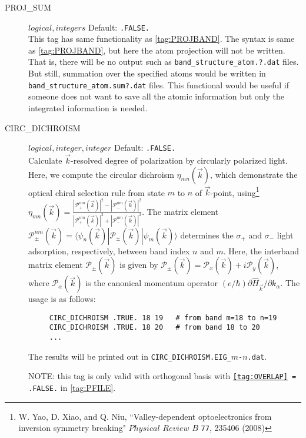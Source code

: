 \documentclass[a4paper,12pt]{scrartcl}
\makeatletter
\def\namedlabel#1#2{\begingroup
    #2%
    \def\@currentlabel{#2}%
    \phantomsection\label{#1}\endgroup
}
\makeatother
\begin{document}
\begin{description}
    \item[\namedlabel{tag:PROSUM}{PROJ\_SUM}] $logical, integers$ Default: \texttt{.FALSE.} \\
		This tag has same functionality as \ref{tag:PROJBAND}. The syntax is same as  \ref{tag:PROJBAND}, but here the atom projection will not be written. That is, there will be no output such as \texttt{band\_structure\_atom.?.dat} files. But still, summation over the specified atoms would be written  in \texttt{band\_structure\_atom.sum?.dat} files. This functional would be useful if someone does not want to save all the atomic information but only the integrated information is needed.
      
     \item[\namedlabel{tag:CIRC}{CIRC\_DICHROISM}] $logical, integer, integer$ Default: \texttt{.FALSE.} \\  
		Calculate ${\vec k}$-resolved degree of polarization by circularly polarized light. Here, we compute the circular dichroism $\eta_{mn}({\vec k})$, which demonstrate the optical chiral selection rule from state $m$ to $n$ of ${\vec k}$-point, using\footnote{W. Yao, D. Xiao, and Q. Niu, ``Valley-dependent optoelectronics from inversion symmetry breaking" $Physical$ $Review$ $B$  \texttt{77}, 235406 (2008)}
				$\eta_{mn}({\vec k}) = \frac{|\mathcal{P}^{nm}_+({\vec k})|^2 - |\mathcal{P}^{nm}_-({\vec k})|^2}{|\mathcal{P}^{nm}_+({\vec k})|^2 + |\mathcal{P}^{nm}_-({\vec k})|^2}$. 
				The matrix element $\mathcal{P}^{nm}_{\pm}({\vec k}) = \langle \psi_n({\vec k})|  \mathcal{P}_{\pm}({\vec k}) |\psi_m({\vec k}) \rangle$ determines the $\sigma_+$ and $\sigma_-$ light adsorption, respectively, between band index $n$ and $m$. 
				Here, the interband matrix element $\mathcal{P}_{\pm}({\vec k})$ is given by 
				$\mathcal{P}_{\pm}({\vec k}) = \mathcal{P}_x({\vec k}) + i \mathcal{P}_y({\vec k})$, where $\mathcal{P}_\alpha({\vec k})$ is the canonical momentum operator $(e/\hbar) \partial \hat{H}_{\vec k} / \partial k_\alpha$.
				The usage is as follows:
	
    \begin{verbatim}
     CIRC_DICHROISM .TRUE. 18 19   # from band m=18 to n=19
     CIRC_DICHROISM .TRUE. 18 20   # from band 18 to 20
     ...
    \end{verbatim}
						The results will be printed out in \texttt{CIRC\_DICHROISM.EIG\_$m$-$n$.dat}.
		
		NOTE: this tag is only valid with orthogonal basis with \texttt{\ref{tag:OVERLAP} = .FALSE.} in \ref{tag:PFILE}.


\end{description}
\end{document}

